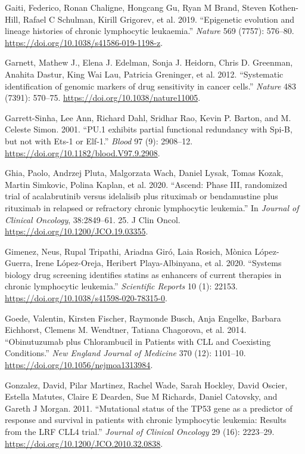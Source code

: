 \documentclass[11pt, a4paper, twosided]{book}
\newenvironment{CSLReferences}%
  {}%
  {\par}
\begin{document}
\begin{CSLReferences}{1}{0}
\leavevmode{}%
Gaiti, Federico, Ronan Chaligne, Hongcang Gu, Ryan M Brand, Steven Kothen-Hill, Rafael C Schulman, Kirill Grigorev, et al. 2019. {``{Epigenetic evolution and lineage histories of chronic lymphocytic leukaemia}.''} \emph{Nature} 569 (7757): 576--80. \url{https://doi.org/10.1038/s41586-019-1198-z}.

\leavevmode{}%
Garnett, Mathew J., Elena J. Edelman, Sonja J. Heidorn, Chris D. Greenman, Anahita Dastur, King Wai Lau, Patricia Greninger, et al. 2012. {``{Systematic identification of genomic markers of drug sensitivity in cancer cells}.''} \emph{Nature} 483 (7391): 570--75. \url{https://doi.org/10.1038/nature11005}.

\leavevmode{}%
Garrett-Sinha, Lee Ann, Richard Dahl, Sridhar Rao, Kevin P. Barton, and M. Celeste Simon. 2001. {``{PU.1 exhibits partial functional redundancy with Spi-B, but not with Ets-1 or Elf-1}.''} \emph{Blood} 97 (9): 2908--12. \url{https://doi.org/10.1182/blood.V97.9.2908}.

\leavevmode{}%
Ghia, Paolo, Andrzej Pluta, Malgorzata Wach, Daniel Lysak, Tomas Kozak, Martin Simkovic, Polina Kaplan, et al. 2020. {``{Ascend: Phase III, randomized trial of acalabrutinib versus idelalisib plus rituximab or bendamustine plus rituximab in relapsed or refractory chronic lymphocytic leukemia}.''} In \emph{Journal of Clinical Oncology}, 38:2849--61. 25. J Clin Oncol. \url{https://doi.org/10.1200/JCO.19.03355}.

\leavevmode{}%
Gimenez, Neus, Rupal Tripathi, Ariadna Giró, Laia Rosich, Mònica López-Guerra, Irene López-Oreja, Heribert Playa-Albinyana, et al. 2020. {``{Systems biology drug screening identifies statins as enhancers of current therapies in chronic lymphocytic leukemia}.''} \emph{Scientific Reports} 10 (1): 22153. \url{https://doi.org/10.1038/s41598-020-78315-0}.

\leavevmode{}%
Goede, Valentin, Kirsten Fischer, Raymonde Busch, Anja Engelke, Barbara Eichhorst, Clemens M. Wendtner, Tatiana Chagorova, et al. 2014. {``{Obinutuzumab plus Chlorambucil in Patients with CLL and Coexisting Conditions}.''} \emph{New England Journal of Medicine} 370 (12): 1101--10. \url{https://doi.org/10.1056/nejmoa1313984}.

\leavevmode{}%
Gonzalez, David, Pilar Martinez, Rachel Wade, Sarah Hockley, David Oscier, Estella Matutes, Claire E Dearden, Sue M Richards, Daniel Catovsky, and Gareth J Morgan. 2011. {``{Mutational status of the TP53 gene as a predictor of response and survival in patients with chronic lymphocytic leukemia: Results from the LRF CLL4 trial}.''} \emph{Journal of Clinical Oncology} 29 (16): 2223--29. \url{https://doi.org/10.1200/JCO.2010.32.0838}.


\end{CSLReferences}
\end{document}
